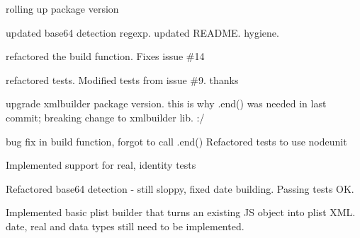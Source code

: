 \begin{DoxyItemize}
\item rolling up package version
\item updated base64 detection regexp. updated R\+E\+A\+D\+ME. hygiene.
\item refactored the build function. Fixes issue \#14
\item refactored tests. Modified tests from issue \#9. thanks 
\item upgrade xmlbuilder package version. this is why .end() was needed in last commit; breaking change to xmlbuilder lib. \+:/
\item bug fix in build function, forgot to call .end() Refactored tests to use nodeunit
\item Implemented support for real, identity tests
\item Refactored base64 detection -\/ still sloppy, fixed date building. Passing tests OK.
\item Implemented basic plist builder that turns an existing JS object into plist X\+ML. date, real and data types still need to be implemented. 
\end{DoxyItemize}
